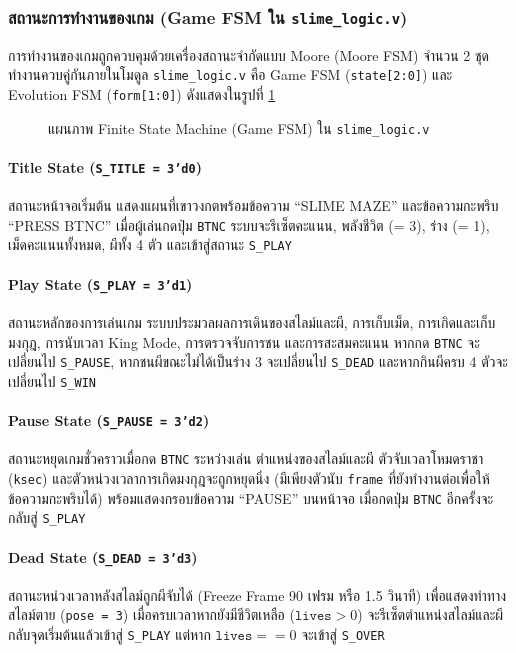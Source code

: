 \subsubsection{สถานะการทำงานของเกม (Game FSM ใน \texttt{slime\_logic.v})}

การทำงานของเกมถูกควบคุมด้วยเครื่องสถานะจำกัดแบบ Moore (Moore FSM) จำนวน 2 ชุดทำงานควบคู่กันภายในโมดูล \texttt{slime\_logic.v} คือ Game FSM (\texttt{state[2:0]}) และ Evolution FSM (\texttt{form[1:0]}) ดังแสดงในรูปที่ \ref{fig:game_fsm}

\begin{figure}[H]
    \centering
    \caption{แผนภาพ Finite State Machine (Game FSM) ใน \texttt{slime\_logic.v}}
    \label{fig:game_fsm}
\end{figure}

\paragraph{Title State (\texttt{S\_TITLE = 3'd0})}
สถานะหน้าจอเริ่มต้น แสดงแผนที่เขาวงกตพร้อมข้อความ “SLIME MAZE” และข้อความกะพริบ “PRESS BTNC” เมื่อผู้เล่นกดปุ่ม \texttt{BTNC} ระบบจะรีเซ็ตคะแนน, พลังชีวิต (= 3), ร่าง (= 1), เม็ดคะแนนทั้งหมด, ผีทั้ง 4 ตัว และเข้าสู่สถานะ \texttt{S\_PLAY}

\paragraph{Play State (\texttt{S\_PLAY = 3'd1})}
สถานะหลักของการเล่นเกม ระบบประมวลผลการเดินของสไลม์และผี, การเก็บเม็ด, การเกิดและเก็บมงกุฎ, การนับเวลา King Mode, การตรวจจับการชน และการสะสมคะแนน หากกด \texttt{BTNC} จะเปลี่ยนไป \texttt{S\_PAUSE}, หากชนผีขณะไม่ได้เป็นร่าง 3 จะเปลี่ยนไป \texttt{S\_DEAD} และหากกินผีครบ 4 ตัวจะเปลี่ยนไป \texttt{S\_WIN}

\paragraph{Pause State (\texttt{S\_PAUSE = 3'd2})}
สถานะหยุดเกมชั่วคราวเมื่อกด \texttt{BTNC} ระหว่างเล่น ตำแหน่งของสไลม์และผี ตัวจับเวลาโหมดราชา (\texttt{ksec}) และตัวหน่วงเวลาการเกิดมงกุฎจะถูกหยุดนิ่ง (มีเพียงตัวนับ \texttt{frame} ที่ยังทำงานต่อเพื่อให้ข้อความกะพริบได้) พร้อมแสดงกรอบข้อความ “PAUSE” บนหน้าจอ เมื่อกดปุ่ม \texttt{BTNC} อีกครั้งจะกลับสู่ \texttt{S\_PLAY}

\paragraph{Dead State (\texttt{S\_DEAD = 3'd3})}
สถานะหน่วงเวลาหลังสไลม์ถูกผีจับได้ (Freeze Frame 90 เฟรม หรือ 1.5 วินาที) เพื่อแสดงท่าทางสไลม์ตาย (\texttt{pose = 3}) เมื่อครบเวลาหากยังมีชีวิตเหลือ ($\texttt{lives} > 0$) จะรีเซ็ตตำแหน่งสไลม์และผีกลับจุดเริ่มต้นแล้วเข้าสู่ \texttt{S\_PLAY} แต่หาก $\texttt{lives} == 0$ จะเข้าสู่ \texttt{S\_OVER}

